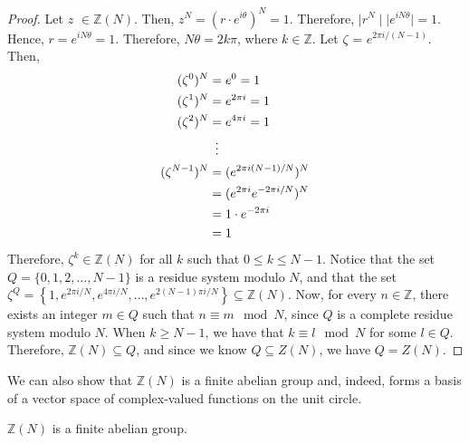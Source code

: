 \documentclass[../article.tex]{subfiles}
\begin{document}
\begin{proof}
Let $z$ $\in \mathbb{Z}(N)$. Then, $z^N = (r \cdot e^{i \theta})^N = 1$. Therefore, $\mid r^N \mid \mid e^{i N \theta} \mid = 1$. Hence, $r = e^{i N \theta} = 1$. Therefore, $N\theta = 2k\pi$, where $k \in \mathbb{Z}$. Let $\zeta$ = $e^{2 \pi i /(N-1)}$. Then,
\begin{align*}
	(\zeta^0)^N &= e^0 = 1 \\
	(\zeta^1)^N &= e^{2 \pi i} = 1 \\
	(\zeta^2)^N &= e^{4 \pi i} = 1 \\
	{} &\vdotswithin{=}\\
	(\zeta^{N-1})^N &= (e^{2 \pi i(N-1)/N})^N \\
	{} &= (e^{2 \pi i}e^{-2 \pi i/N})^N \\
	{} &= 1 \cdot e^{-2 \pi i} \\
	{} &= 1
\end{align*}
Therefore, $\zeta^k \in \mathbb{Z}(N)$ for all $k$ such that $0 \leq k \leq N-1$. Notice that the set $Q = \{0, 1, 2, \ldots, N-1\}$ is a residue system modulo $N$, and that the set $\zeta^Q = \left\{1, e^{2 \pi i/N}, e^{4 \pi i/N}, \ldots, e^{2(N-1) \pi i/N}\right\} \subseteq \mathbb{Z}(N) $.
Now, for every $n \in \mathbb{Z}$, there exists an integer $m \in Q$ such that $n \equiv m \mod N$, since $Q$ is a complete residue system modulo $N$. When $k \geq N-1$, we have that $k \equiv l \mod N$ for some $l \in Q$. Therefore, $\mathbb{Z}(N) \subseteq Q$, and since we know $Q \subseteq Z(N)$, we have $Q = Z(N)$.
\end{proof}

We can also show that $\mathbb{Z}(N)$ is a finite abelian group and, indeed, forms a basis of a vector space of complex-valued functions on the unit circle.

\begin{theorem}
$\mathbb{Z}(N)$ is a finite abelian group.
\end{theorem}
\end{document}
